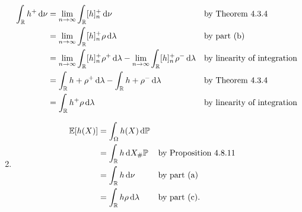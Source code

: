 \begin{enumerate}[label=(\alph*)]
\begin{align*}
	\int_{\mathbb R} h^+ \, \mathrm{d} \nu &= \lim_{n \to \infty} \int_{\mathbb R} [h]_n^+ \, \mathrm{d} \nu &&\text{by Theorem 4.3.4}\\
	&= \lim_{n \to \infty} \int_{\mathbb R} [h]_n^+ \rho \, \mathrm{d} \lambda &&\text{by part (b)} \\
	&= \lim_{n \to \infty} \int_{\mathbb R} [h]_n^+ \rho^+ \, \mathrm{d} \lambda
		- \lim_{n \to \infty} \int_{\mathbb R} [h]_n^+ \rho^- \, \mathrm{d} \lambda &&\text{by linearity of integration} \\
	&= \int_{\mathbb R} h+ \rho^+ \, \mathrm{d} \lambda - \int_{\mathbb R} h+ \rho^- \, \mathrm{d} \lambda &&\text{by Theorem 4.3.4} \\
	&= \int_{\mathbb R} h^+ \rho \, \mathrm{d} \lambda &&\text{by linearity of integration}
\end{align*}
\item 
\begin{align*}
	\mathbb E[h(X)] &= \int_\Omega h(X) \, \mathrm{d} \mathbb P \\
	&= \int_{\mathbb R} h \, \mathrm{d} X_\# \mathbb P &&\text{by Proposition 4.8.11}\\
	&= \int_{\mathbb R} h \, \mathrm{d} \nu &&\text{by part (a)}\\
	&= \int_{\mathbb R} h \rho \, \mathrm{d} \lambda &&\text{by part (c)}.
\end{align*}
\end{enumerate}   
